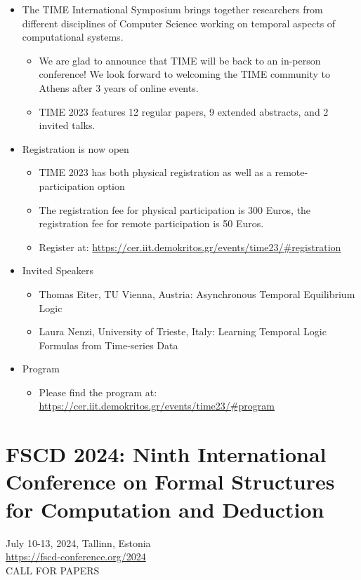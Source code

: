 \documentclass[prodmode,acmtecs]{acmsmall} %
\begin{document}
\begin{itemize}\item  The TIME International Symposium brings together researchers from different disciplines of Computer Science working on temporal aspects of computational systems. 
 
\begin{itemize}\item  We are glad to announce that TIME will be back to an in-person conference! We look forward to welcoming the TIME community to Athens after 3 years of online events.
\item  TIME 2023 features 12 regular papers, 9 extended abstracts, and 2 invited talks.
\end{itemize} 
\item  Registration is now open 
 
\begin{itemize}\item  TIME 2023 has both physical registration as well as a remote-participation option
\item  The registration fee for physical participation is 300 Euros, the registration fee for remote participation is 50 Euros.
\item  Register at: \href{https://cer.iit.demokritos.gr/events/time23/#registration}{https://cer.iit.demokritos.gr/events/time23/\#registration}
\end{itemize} 
\item  Invited Speakers 
 
\begin{itemize}\item  Thomas Eiter, TU Vienna, Austria: Asynchronous Temporal Equilibrium Logic
\item  Laura Nenzi, University of Trieste, Italy: Learning Temporal Logic Formulas from Time-series Data
\end{itemize} 
\item  Program 
 
\begin{itemize}\item  Please find the program at: \href{https://cer.iit.demokritos.gr/events/time23/#program}{https://cer.iit.demokritos.gr/events/time23/\#program}
\end{itemize} 
\end{itemize}\section{FSCD 2024: Ninth International Conference on Formal Structures for Computation and Deduction}\label{FSCD2024}  July 10-13, 2024, Tallinn, Estonia\\ 
  \href{https://fscd-conference.org/2024}{https://fscd-conference.org/2024}\\ 
CALL FOR PAPERS 
\end{document}
